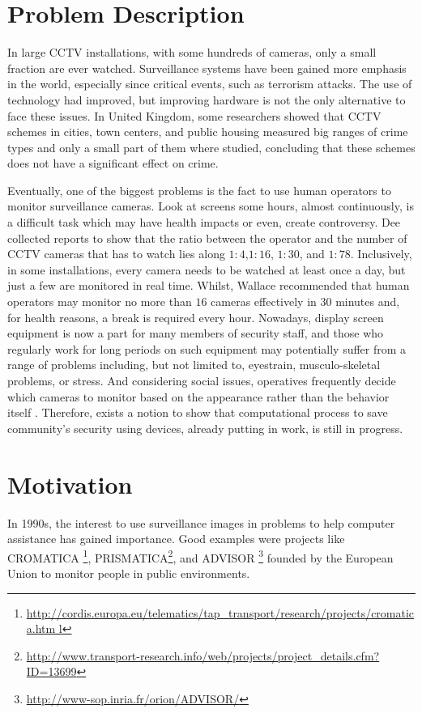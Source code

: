 \section{Problem Description}
In large CCTV installations, with some hundreds of cameras, only a small
fraction are ever watched. \cite{Dee:2007:HowClose} Surveillance systems have
been gained more emphasis in the world, especially since critical events, such
as terrorism attacks. The use of technology had improved, but improving hardware
is not the only alternative to face these issues. In United Kingdom, some
researchers showed that CCTV schemes in cities, town centers, and public housing
measured big ranges of crime types and only a small part of them where
studied, concluding that these schemes does not have a significant effect on
crime. \cite{Farrington:2007:EffectsCCTV,
Farrington:2008:EffectsCCTV} 

Eventually, one of the biggest problems is the fact to use human operators to
monitor surveillance cameras. Look at screens some hours, almost continuously,
is a difficult task which may have health impacts or even, create
controversy. Dee \etal \cite{Dee:2007:HowClose} collected reports to show that
the ratio between the operator and the number of CCTV cameras that has to watch
lies along $1:4$,$1:16$, $1:30$, and $1:78$. Inclusively, in some
installations, every camera needs to be watched at least once a day, but just a
few are monitored in real time. Whilst, Wallace \etal
\cite{Wallace:1998:CCTV} recommended that human operators may monitor no more
than $16$ cameras effectively in 30 minutes and, for health reasons, a break is
required every hour. Nowadays, display screen equipment is now a part for many
members of security staff, and those who regularly work for long periods on such
equipment may potentially suffer from a range of problems including, but not
limited to, eyestrain, musculo-skeletal problems, or stress.
\cite{HMPrison:2000:DisplayScreen} And considering social issues, operatives
frequently decide which cameras to monitor based on the appearance rather than
the behavior itself \cite{McCahill:2003:CCTV}. Therefore, exists a notion to
show that computational process to save community's security using devices,
already putting in work, is still in progress.

\section{Motivation}
In 1990s, the interest to use surveillance images in problems to help
computer assistance has gained importance. \cite{Rosin:1991:ImageInterpretation}
Good examples were projects like CROMATICA
\footnote{\url{
http://cordis.europa.eu/telematics/tap_transport/research/projects/cromatica.htm
l}}, PRISMATICA\footnote{\url{
http://www.transport-research.info/web/projects/project_details.cfm?ID=13699}},
and ADVISOR \footnote{\url{
http://www-sop.inria.fr/orion/ADVISOR/}} founded by the European Union to
monitor people in public environments.

